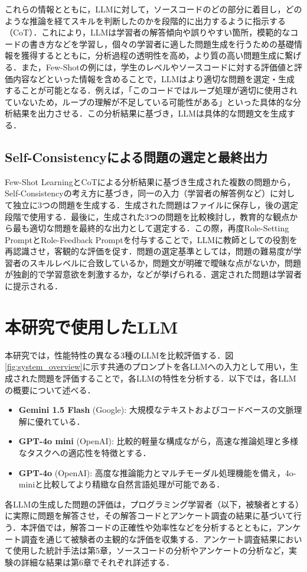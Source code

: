 \documentclass[11pt]{jreport}
\begin{document}
これらの情報とともに，LLMに対して，ソースコードのどの部分に着目し，どのような推論を経てスキルを判断したのかを段階的に出力するように指示する（CoT）．これにより，LLMは学習者の解答傾向や誤りやすい箇所，模範的なコードの書き方などを学習し，個々の学習者に適した問題生成を行うための基礎情報を獲得するとともに，分析過程の透明性を高め，より質の高い問題生成に繋げる．また，Few-Shotの例には，学生のレベルやソースコードに対する評価値と評価内容などといった情報を含めることで，LLMはより適切な問題を選定・生成することが可能となる．例えば，「このコードではループ処理が適切に使用されていないため，ループの理解が不足している可能性がある」といった具体的な分析結果を出力させる．この分析結果に基づき，LLMは具体的な問題文を生成する．


\subsection{Self-Consistencyによる問題の選定と最終出力}

Few-Shot LearningとCoTによる分析結果に基づき生成された複数の問題から，Self-Consistencyの考え方に基づき，同一の入力（学習者の解答例など）に対して独立に3つの問題を生成する．生成された問題はファイルに保存し，後の選定段階で使用する．最後に，生成された3つの問題を比較検討し，教育的な観点から最も適切な問題を最終的な出力として選定する．この際，再度Role-Setting PromptとRole-Feedback Promptを付与することで，LLMに教師としての役割を再認識させ，客観的な評価を促す．問題の選定基準としては，問題の難易度が学習者のスキルレベルに合致しているか，問題文が明確で曖昧な点がないか，問題が独創的で学習意欲を刺激するか，などが挙げられる．選定された問題は学習者に提示される．


\section{本研究で使用したLLM}
本研究では，性能特性の異なる3種のLLMを比較評価する．図\ref{fig:system_overview}に示す共通のプロンプトを各LLMへの入力として用い，生成された問題を評価することで，各LLMの特性を分析する．以下では，各LLMの概要について述べる．
\begin{itemize}
\item \textbf{Gemini 1.5 Flash} (Google): 大規模なテキストおよびコードベースの文脈理解に優れている．
\item \textbf{GPT-4o mini} (OpenAI): 比較的軽量な構成ながら，高速な推論処理と多様なタスクへの適応性を特徴とする．
\item \textbf{GPT-4o} (OpenAI): 高度な推論能力とマルチモーダル処理機能を備え，4o-miniと比較してより精緻な自然言語処理が可能である．
\end{itemize}
各LLMの生成した問題の評価は，プログラミング学習者（以下，被験者とする）に実際に問題を解答させ，その解答コードとアンケート調査の結果に基づいて行う．本評価では，解答コードの正確性や効率性などを分析するとともに，アンケート調査を通じて被験者の主観的な評価を収集する．アンケート調査結果において使用した統計手法は第5章，ソースコードの分析やアンケートの分析など，実験の詳細な結果は第6章でそれぞれ詳述する．
\end{document}
